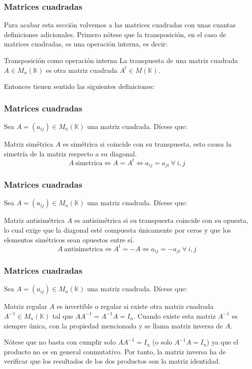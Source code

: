 \documentclass[12pt]{article}
\begin{document}
 
 \begin{frame}
  \frametitle{Matrices cuadradas}
Para acabar esta secci\'on volvemos a las matrices cuadradas con unas cuantas definiciones adicionales. Primero n\'otese que la transposici\'on, en el caso de matrices cuadradas, es una operaci\'on interna, es decir:

  \begin{block}{Transposici\'on como operaci\'on interna}
La transpuesta de una matriz cuadrada $A\in M_n(\mathbb{K})$  es otra matriz cuadrada $A^t\in M(\mathbb{K})$.
\end{block}

 Entonces tienen sentido las siguientes definiciones:
 \end{frame} 


 \begin{frame}
  \frametitle{Matrices cuadradas}
Sea $A=(a_{ij})\in M_n(\mathbb{K})$ una matriz cuadrada. D\'icese que:
  \begin{block}{Matriz sim\'etrica}
$A$ es sim\'etrica si coincide con su transpuesta, esto causa la simetr\'ia de la matriz respecto a su diagonal.
\[A \ \mathrm{simetrica} \Longleftrightarrow A = A^t \Longleftrightarrow a_{ij} = a_{ji}\ \forall\ i,j \]
\end{block}
 \end{frame} 
 
  \begin{frame}
  \frametitle{Matrices cuadradas}
Sea $A=(a_{ij})\in M_n(\mathbb{K})$ una matriz cuadrada. D\'icese que:
 
  \begin{block}{Matriz antisim\'etrica}
$A$ es antisim\'etrica si su transpuesta coincide con su opuesta, lo cual exige que la diagonal est\'e compuesta \'unicamente por ceros y que los elementos sim\'etricos sean opuestos entre s\'i.
\[A \ \mathrm{antisimetrica} \Longleftrightarrow A^t = -A \Longleftrightarrow a_{ij} = -a_{ji}\ \forall\ i,j \]
\end{block}
 \end{frame} 



 \begin{frame}
  \frametitle{Matrices cuadradas}
Sea $A=(a_{ij})\in M_n(\mathbb{K})$ una matriz cuadrada. D\'icese que:
  \begin{block}{Matriz regular}
$A$ es invertible o regular si existe otra matriz cuadrada $A^{-1} \in M_n(\mathbb{K})$ tal que $AA^{-1} = A^{-1}A = I_n$. Cuando existe esta matriz $A^{-1}$ es siempre \'unica, con la propiedad mencionada y se llama matriz inversa de $A$.
\end{block}

N\'otese que no basta con cumplir solo $AA^{-1} = I_n$ (o solo $A^{-1}A = I_n$) ya que el producto no es en general conmutativo. Por tanto, la matriz inversa ha de verificar que los resultados de los dos productos son la matriz identidad.

 \end{frame} 
 
\end{document}
